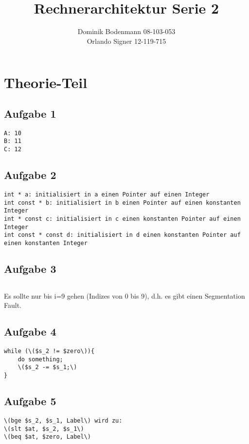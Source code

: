 \documentclass[a4paper,abstracton]{scrartcl}
\title{Rechnerarchitektur Serie 2}
\author{Dominik Bodenmann 08-103-053\\
	Orlando Signer 12-119-715\\}
\begin{document}
\maketitle

\section{Theorie-Teil}
\subsection{Aufgabe 1}
\begin{lstlisting}[caption=Ausgabe]
A: 10
B: 11
C: 12
\end{lstlisting}

\subsection{Aufgabe 2}
\begin{lstlisting}[caption=Eigenschaften]
int * a: initialisiert in a einen Pointer auf einen Integer
int const * b: initialisiert in b einen Pointer auf einen konstanten Integer
int * const c: initialisiert in c einen konstanten Pointer auf einen Integer
int const * const d: initialisiert in d einen konstanten Pointer auf einen konstanten Integer
\end{lstlisting}

\subsection{Aufgabe 3}
\begin{lstlisting}[caption=Problem]
\end {lstlisting}
Es sollte nur bis i=9 gehen (Indizes von 0 bis 9), d.h. es gibt einen Segmentation Fault.

\subsection{Aufgabe 4}
\begin{lstlisting}[caption=C-Code]
while (\($s_2 != $zero\)){
	do something;
	\($s_2 -= $s_1;\)
}
\end{lstlisting}

\subsection{Aufgabe 5}
\begin{lstlisting}[caption=Erweiterung]
\(bge $s_2, $s_1, Label\) wird zu:
\(slt $at, $s_2, $s_1\)
\(beq $at, $zero, Label\)
\end{lstlisting}
\end{document}
